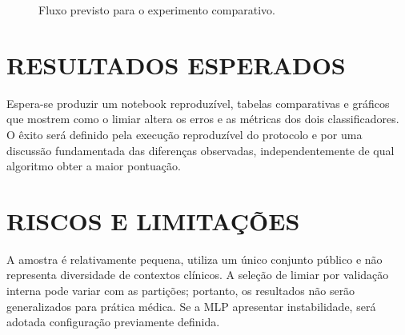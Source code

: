 \documentclass[article,11pt,oneside,a4paper,english,brazil,sumario=tradicional]{abntex2}
\begin{document}
\begin{figure}[!ht]
\centering
{}
\caption{Fluxo previsto para o experimento comparativo.}
\par\vspace{1mm}{\footnotesize Fonte: elaboração própria (2026).}
\end{figure}

\section{RESULTADOS ESPERADOS}
Espera-se produzir um notebook reproduzível, tabelas comparativas e gráficos que mostrem como o limiar altera os erros e as métricas dos dois classificadores. O êxito será definido pela execução reproduzível do protocolo e por uma discussão fundamentada das diferenças observadas, independentemente de qual algoritmo obter a maior pontuação.

\section{RISCOS E LIMITAÇÕES}
A amostra é relativamente pequena, utiliza um único conjunto público e não representa diversidade de contextos clínicos. A seleção de limiar por validação interna pode variar com as partições; portanto, os resultados não serão generalizados para prática médica. Se a MLP apresentar instabilidade, será adotada configuração previamente definida.
\end{document}
